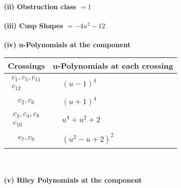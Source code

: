 \documentclass[1p]{elsarticle_modified}
\theoremstyle{definition}
\begin{document}
\flushleft \textbf{(ii) Obstruction class $= 1$}\\~\\
\flushleft \textbf{(iii) Cusp Shapes $= -4 u^2-12$}\\~\\
\newpage\renewcommand{\arraystretch}{1}
\flushleft \textbf{(iv) u-Polynomials at the component}\newline \\
\begin{tabular}{m{50pt}|m{274pt}}
Crossings & \hspace{64pt}u-Polynomials at each crossing \\
\hline $$\begin{aligned}c_{1},c_{5},c_{11}\\c_{12}\end{aligned}$$&$\begin{aligned}
&(u-1)^4
\end{aligned}$\\
\hline $$\begin{aligned}c_{2},c_{6}\end{aligned}$$&$\begin{aligned}
&(u+1)^4
\end{aligned}$\\
\hline $$\begin{aligned}c_{3},c_{4},c_{8}\\c_{10}\end{aligned}$$&$\begin{aligned}
&u^4+u^2+2
\end{aligned}$\\
\hline $$\begin{aligned}c_{7},c_{9}\end{aligned}$$&$\begin{aligned}
&(u^2- u+2)^2
\end{aligned}$\\
\hline
\end{tabular}\\~\\
\newpage\renewcommand{\arraystretch}{1}
\flushleft \textbf{(v) Riley Polynomials at the component}\newline \\
\end{document}
